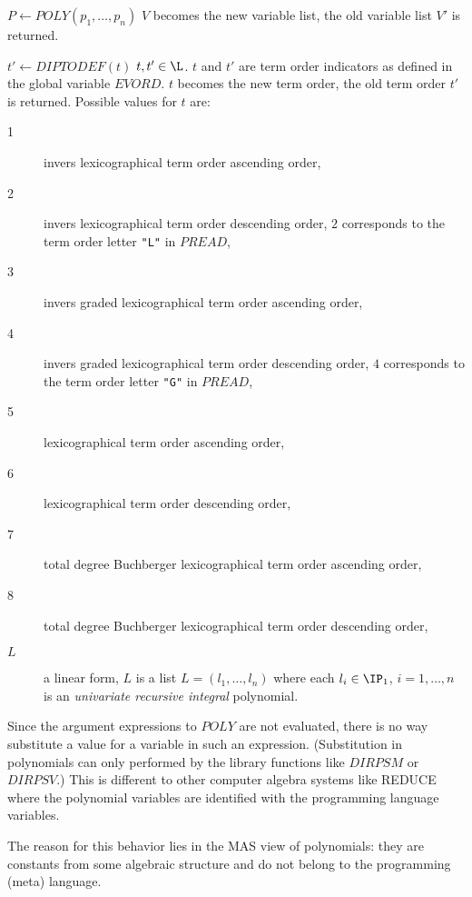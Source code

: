 \begin{deflist}{$P \gets POLY(p_1, \ldots, p_n)$}
      $V$ becomes the new variable list, 
      the old variable list $V'$ is returned.
\item[$t' \gets DIPTODEF(t)$] $t, t' \in \L$. 
      $t$ and $t'$ are term order indicators as  
      defined in the global variable $EVORD$. 
      $t$ becomes the new term order, 
      the old term order $t'$ is returned. 
      Possible values for $t$ are:
      \begin{description}
      \item[1] invers lexicographical term order 
               ascending order,
      \item[2] invers lexicographical term order 
               descending order,
               $2$ corresponds to the term order letter \verb/"L"/
               in $PREAD$,
      \item[3] invers graded lexicographical term order 
               ascending order,
      \item[4] invers graded lexicographical term order 
               descending order,
               $4$ corresponds to the term order letter \verb/"G"/
               in $PREAD$,
      \item[5] lexicographical term order ascending order,
      \item[6] lexicographical term order descending order,
      \item[7] total degree Buchberger lexicographical term order
               ascending order,
      \item[8] total degree Buchberger lexicographical term order
               descending order,
      \item[$L$] a linear form, $L$ is a list 
               $L = ( l_1, \ldots, l_n )$ where 
               each $l_i \in \IP_1$, $i=1,\ldots,n$ 
               is an 
               {\em univariate recursive integral} polynomial. 
      \end{description}
\end{deflist}
Since the argument expressions to $POLY$ are not 
evaluated, there is no way substitute a value for 
a variable in such an expression. 
(Substitution in polynomials can only performed by 
the library functions like $DIRPSM$ or $DIRPSV$.) 
This is different 
to other computer algebra systems like REDUCE where the 
polynomial variables are identified with the 
programming language variables.   

The reason for this behavior lies in the 
MAS view of polynomials: 
they are constants from some algebraic structure 
and do not belong to the programming (meta) language.   


